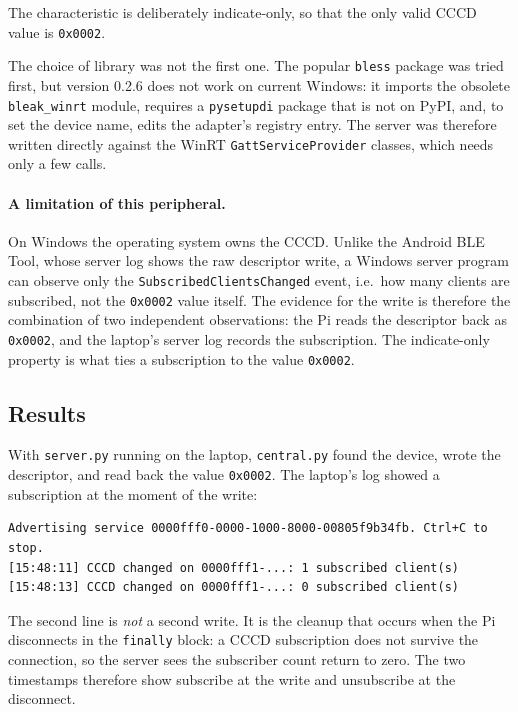\documentclass[11pt,a4paper]{article}
\begin{document}


The characteristic is deliberately indicate-only, so that the only valid CCCD
value is \texttt{0x0002}.

The choice of library was not the first one. The popular \texttt{bless}
package was tried first, but version 0.2.6 does not work on current Windows: it
imports the obsolete \texttt{bleak\_winrt} module, requires a
\texttt{pysetupdi} package that is not on PyPI, and, to set the device name, edits the adapter's
registry entry. The server was therefore written directly
against the WinRT \texttt{GattServiceProvider} classes, which needs only a few
calls.

\paragraph{A limitation of this peripheral.} On Windows the operating system
owns the CCCD. Unlike the Android BLE Tool, whose server log shows the raw
descriptor write, a Windows server program can observe only the
\texttt{SubscribedClientsChanged} event, i.e.\ how many clients are
subscribed, not the \texttt{0x0002} value itself. The evidence for the write
is therefore the combination of two independent observations: the Pi reads the
descriptor back as \texttt{0x0002}, and the laptop's server log records the
subscription. The indicate-only property is what ties a subscription to the
value \texttt{0x0002}.

\subsection{Results}

With \texttt{server.py} running on the laptop, \texttt{central.py} found the
device, wrote the descriptor, and read back the value \texttt{0x0002}. The
laptop's log showed a subscription at the moment of the write:

\begin{lstlisting}[style=shellstyle,caption={Laptop log during one run of the central.}]
Advertising service 0000fff0-0000-1000-8000-00805f9b34fb. Ctrl+C to stop.
[15:48:11] CCCD changed on 0000fff1-...: 1 subscribed client(s)
[15:48:13] CCCD changed on 0000fff1-...: 0 subscribed client(s)
\end{lstlisting}

The second line is \emph{not} a second write. It is the cleanup that occurs
when the Pi disconnects in the \texttt{finally} block: a CCCD subscription does
not survive the connection, so the server sees the subscriber count return to
zero. The two timestamps therefore show subscribe at the write and unsubscribe
at the disconnect.
\end{document}
